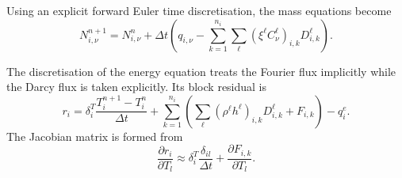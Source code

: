 

Using an explicit forward Euler time discretisation, the mass
equations become
\begin{equation}
  N_{i,\nu}^{n+1} = N_{i,\nu}^n +
  \Delta t \left(
    q_{i,\nu} -
    \sum_{k=1}^{n_i} \sum_\ell
    \left(\xi^\ell C_\nu^\ell\right)_{i,k} D_{i,k}^\ell
  \right).
\end{equation}



The discretisation of the energy equation treats the Fourier flux
implicitly while the Darcy flux is taken explicitly. Its block
residual is
\begin{equation}
  r_i = \delta_i^T \frac{T_i^{n+1} - T_i^n}{\Delta t} +
  \sum_{k=1}^{n_i} \left(\sum_\ell
    \left(\rho^\ell h^\ell\right)_{i,k}
    D_{i,k}^\ell + F_{i,k}
  \right) - q_i^e.
\end{equation}
The Jacobian matrix is formed from
\begin{equation}
  \frac{\partial r_i}{\partial T_l} \approx
  \delta_i^T\frac{\delta_{il}}{\Delta t} +
  \frac{\partial F_{i,k}}{\partial T_l}.
\end{equation}

